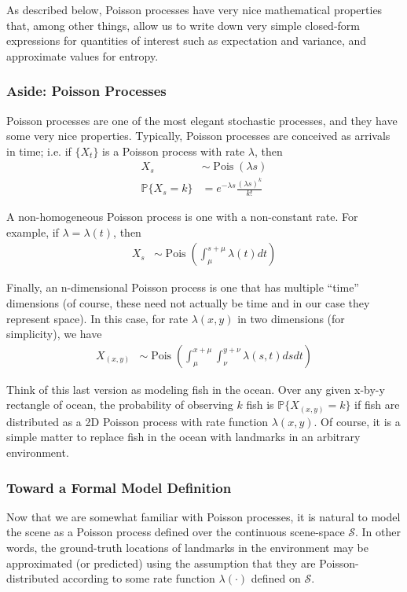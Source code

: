 \documentclass[12pt]{article}
\DeclareMathOperator{\Pois}{Pois}
\begin{document}
As described below, Poisson processes have very nice mathematical properties that, among other things, allow us to write down very simple closed-form expressions for quantities of interest such as expectation and variance, and approximate values for entropy.

\subsubsection{Aside: Poisson Processes}

Poisson processes are one of the most elegant stochastic processes, and they have some very nice properties. Typically, Poisson processes are conceived as arrivals in time; i.e. if $\{X_t\}$ is a Poisson process with rate $\lambda$, then
\begin{align}
  X_s &\sim \Pois(\lambda s) \\
  \mathbb{P}\{X_s = k\} &= e^{-\lambda s}\frac{(\lambda s)^k}{k!}
\end{align}

A non-homogeneous Poisson process is one with a non-constant rate. For example, if $\lambda = \lambda(t)$, then
\begin{align}
  X_s &\sim \Pois \left( \int_{\mu}^{s + \mu} \lambda(t) dt \right)
\end{align}

Finally, an n-dimensional Poisson process is one that has multiple ``time'' dimensions (of course, these need not actually be time and in our case they represent space). In this case, for rate $\lambda(x, y)$ in two dimensions (for simplicity), we have
\begin{align}
  X_{(x, y)} &\sim \Pois \left( \int_{\mu}^{x + \mu} \int_{\nu}^{y + \nu} \lambda(s, t) ds dt \right)
\end{align}

Think of this last version as modeling fish in the ocean. Over any given x-by-y rectangle of ocean, the probability of observing $k$ fish is $\mathbb{P}\{X_{(x, y)} = k\}$ if fish are distributed as a 2D Poisson process with rate function $\lambda(x, y)$. Of course, it is a simple matter to replace fish in the ocean with landmarks in an arbitrary environment.

\subsubsection{Toward a Formal Model Definition}

Now that we are somewhat familiar with Poisson processes, it is natural to model the scene as a Poisson process defined over the continuous scene-space $\mathcal{S}$. In other words, the ground-truth locations of landmarks in the environment may be approximated (or predicted) using the assumption that they are Poisson-distributed according to some rate function $\lambda(\cdot)$ defined on $\mathcal{S}$.
\end{document}
